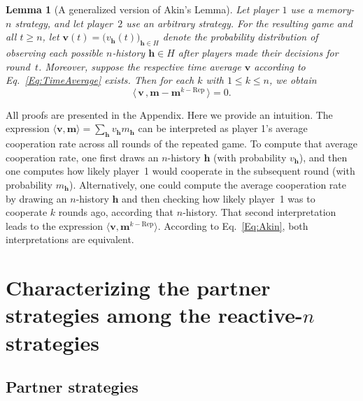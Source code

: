 \documentclass[11pt]{article}
\theoremstyle{plainCl1}
\newtheorem{lemma}[theorem]{Lemma}
\theoremstyle{plainCl2}
\begin{document}

\begin{lemma}[A generalized version of Akin's Lemma]\label{lemma:AkinGeneralised}
Let player $1$ use a memory-$n$ strategy, and let player~$2$ use an arbitrary
strategy. For the resulting game and all $t\!\ge\!n$, let $\mathbf{v}(t)\!=\!\big( v_\mathbf{h}(t) \big)_{\mathbf{h}\in H}$ denote the probability distribution of observing each possible $n$-history $\mathbf{h}\!\in\! H$ after players made their decisions for round~$t$. Moreover, suppose the respective time average $\mathbf{v}$ according to Eq.~\eqref{Eq:TimeAverage} exists. Then for each $k$ with $1\!\le\!k\!\le\!n$, we obtain
\begin{equation} \label{Eq:Akin}
\big\langle\, \mathbf{v}\, , \mathbf{m}-\mathbf{m}^{k-\text{Rep}}\,\big\rangle = 0. 
\end{equation}
\end{lemma}


\noindent
All proofs are presented in the Appendix. Here we provide an intuition.
The expression $\langle \mathbf{v}, \mathbf{m} \rangle \!=\! \sum_\mathbf{h} v_\mathbf{h}m_\mathbf{h}$ can be interpreted as player 1's average cooperation rate across all rounds of the repeated game.
To compute that average cooperation rate, one first draws an $n$-history $\mathbf{h}$ (with probability $v_\mathbf{h}$), and then one computes how likely player~1 would cooperate in the subsequent round (with probability $m_\mathbf{h}$). 
Alternatively, one could compute the average cooperation rate by drawing an $n$-history $\mathbf{h}$ and then checking how likely player~1 was to cooperate $k$ rounds ago, according that $n$-history. 
That second interpretation leads to the expression $\langle \mathbf{v}, \mathbf{m}^{k-\text{Rep}} \rangle$. 
According to Eq.~\eqref{Eq:Akin}, both interpretations are equivalent.\\






\section{Characterizing the partner strategies among the reactive-$n$ strategies}

\subsection{Partner strategies}
\end{document}
